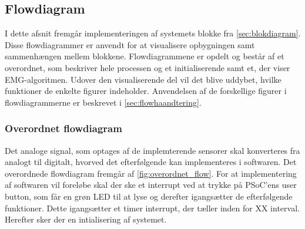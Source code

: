 \subsection{Flowdiagram}
I dette afsnit fremgår implementeringen af systemets blokke fra \autoref{sec:blokdiagram}. Disse flowdiagrammer er anvendt for at visualisere opbygningen samt sammenhængen mellem blokkene. Flowdiagrammene er opdelt og består af et overordnet, som beskriver hele processen og et initialiserende samt et, der viser EMG-algoritmen. Udover den visualiserende del vil det blive uddybet, hvilke funktioner de enkelte figurer indeholder. Anvendelsen af de forskellige figurer i flowdiagrammerne er beskrevet i \autoref{sec:flowhaandtering}.

\subsubsection{Overordnet flowdiagram}
Det analoge signal, som optages af de implemterende sensorer skal konverteres fra analogt til digitalt, hvorved det efterfølgende kan implementeres i softwaren. Det overordnede flowdiagram fremgår af \autoref{fig:overordnet_flow}. For at implementering af softwaren vil foreløbe skal der ske et interrupt ved at trykke på PSoC'ens user button, som får en grøn LED til at lyse og derefter igangsætter de efterfølgende funktioner. Dette igangsætter et timer interrupt, der tæller inden for XX interval. Herefter sker der en intialisering af systemet.
